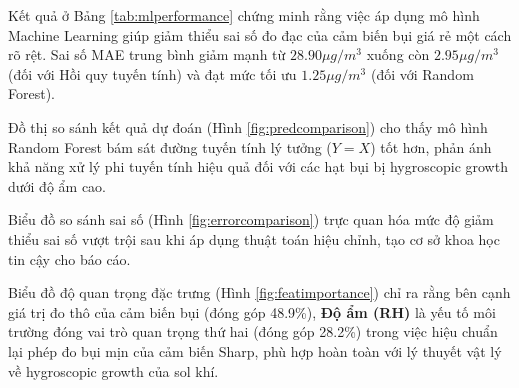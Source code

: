 Kết quả ở Bảng \ref{tab:mlperformance} chứng minh rằng việc áp dụng mô hình Machine Learning giúp giảm thiểu sai số đo đạc của cảm biến bụi giá rẻ một cách rõ rệt. Sai số MAE trung bình giảm mạnh từ \textbf{$28.90 \mu g/m^3$} xuống còn \textbf{$2.95 \mu g/m^3$} (đối với Hồi quy tuyến tính) và đạt mức tối ưu \textbf{$1.25 \mu g/m^3$} (đối với Random Forest).

Đồ thị so sánh kết quả dự đoán (Hình \ref{fig:predcomparison}) cho thấy mô hình Random Forest bám sát đường tuyến tính lý tưởng ($Y = X$) tốt hơn, phản ánh khả năng xử lý phi tuyến tính hiệu quả đối với các hạt bụi bị hygroscopic growth dưới độ ẩm cao.

Biểu đồ so sánh sai số (Hình \ref{fig:errorcomparison}) trực quan hóa mức độ giảm thiểu sai số vượt trội sau khi áp dụng thuật toán hiệu chỉnh, tạo cơ sở khoa học tin cậy cho báo cáo.

Biểu đồ độ quan trọng đặc trưng (Hình \ref{fig:featimportance}) chỉ ra rằng bên cạnh giá trị đo thô của cảm biến bụi (đóng góp 48.9\%), \textbf{Độ ẩm (RH)} là yếu tố môi trường đóng vai trò quan trọng thứ hai (đóng góp 28.2\%) trong việc hiệu chuẩn lại phép đo bụi mịn của cảm biến Sharp, phù hợp hoàn toàn với lý thuyết vật lý về hygroscopic growth của sol khí.

